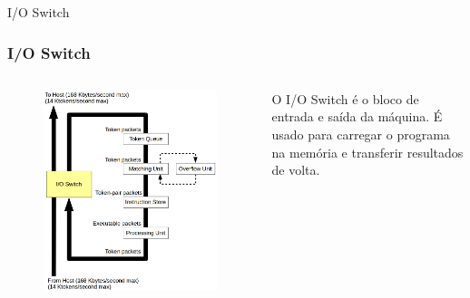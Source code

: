 \documentclass{beamer}
\begin{document}
\begin{frame}{I/O Switch}
	\subsubsection{I/O Switch}
	\begin{columns}
		\column{6cm}
			\begin{figure}
				\centering
				\includegraphics[width=\textwidth]{IOSwitch}
			\end{figure}

			O I/O Switch é o bloco de entrada e saída da máquina. É usado para carregar o programa na memória e transferir resultados de volta.
	\end{columns}
\end{frame}
\end{document}
